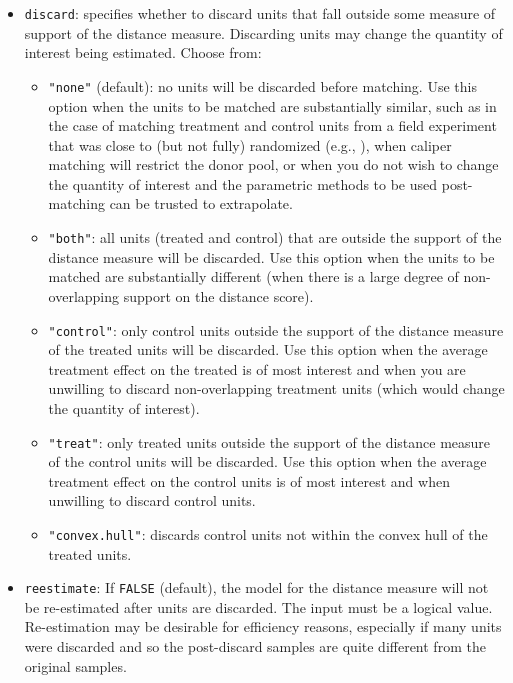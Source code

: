 \begin{itemize}
\item \texttt{discard}: specifies whether to discard units that fall outside
  some measure of support of the distance measure.  Discarding units
may change the quantity of interest being estimated.  Choose from:  
  \begin{itemize}
  \item \texttt{"none"} (default): no units will be discarded before
    matching.  Use this option when the units to be matched are
    substantially similar, such as in the case of matching treatment
    and control units from a field experiment that was close to (but
    not fully) randomized (e.g., \citealt{Imai05}), when caliper
    matching will restrict the donor pool, or when you do not wish to
    change the quantity of interest and the parametric methods to be
    used post-matching can be trusted to extrapolate.
  \item \texttt{"both"}: all units (treated and control) that are
    outside the support of the distance measure will be discarded. Use
    this option when the units to be matched are substantially
    different (when there is a large degree of non-overlapping support
    on the distance score).
  \item \texttt{"control"}: only control units outside the support of
    the distance measure of the treated units will be discarded.  Use
    this option when the average treatment effect on the treated is of
    most interest and when you are unwilling to discard non-overlapping
    treatment units (which would change the quantity of interest).
  \item \texttt{"treat"}: only treated units outside the support of
    the distance measure of the control units will be discarded.  Use
    this option when the average treatment effect on the control units
    is of most interest and when unwilling to discard control units.
  \item \texttt{"convex.hull"}: discards control units not within the
    convex hull of the treated units. 
  \end{itemize}
  
\item \texttt{reestimate}: If {\tt FALSE} (default), the model for
  the distance measure will not be re-estimated after units are
  discarded.  The input must be a logical value.  Re-estimation may be
  desirable for efficiency reasons, especially if many units were
  discarded and so the post-discard samples are quite different from
  the original samples.
  
\end{itemize}

